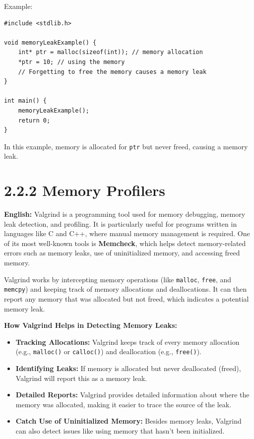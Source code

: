\documentclass{article}
\begin{document}
Example:
\begin{verbatim}
#include <stdlib.h>

void memoryLeakExample() {
    int* ptr = malloc(sizeof(int)); // memory allocation
    *ptr = 10; // using the memory
    // Forgetting to free the memory causes a memory leak
}

int main() {
    memoryLeakExample();
    return 0;
}
\end{verbatim}

In this example, memory is allocated for \texttt{ptr} but never freed, causing a memory leak.








\section*{2.2.2 Memory Profilers}

\textbf{English:} 
Valgrind is a programming tool used for memory debugging, memory leak detection, and profiling. It is particularly useful for programs written in languages like C and C++, where manual memory management is required. One of its most well-known tools is \textbf{Memcheck}, which helps detect memory-related errors such as memory leaks, use of uninitialized memory, and accessing freed memory.

Valgrind works by intercepting memory operations (like \texttt{malloc}, \texttt{free}, and \texttt{memcpy}) and keeping track of memory allocations and deallocations. It can then report any memory that was allocated but not freed, which indicates a potential memory leak.

\textbf{How Valgrind Helps in Detecting Memory Leaks:}
\begin{itemize}
    \item \textbf{Tracking Allocations:} Valgrind keeps track of every memory allocation (e.g., \texttt{malloc()} or \texttt{calloc()}) and deallocation (e.g., \texttt{free()}).
    \item \textbf{Identifying Leaks:} If memory is allocated but never deallocated (freed), Valgrind will report this as a memory leak.
    \item \textbf{Detailed Reports:} Valgrind provides detailed information about where the memory was allocated, making it easier to trace the source of the leak.
    \item \textbf{Catch Use of Uninitialized Memory:} Besides memory leaks, Valgrind can also detect issues like using memory that hasn't been initialized.
\end{itemize}
\end{document}
